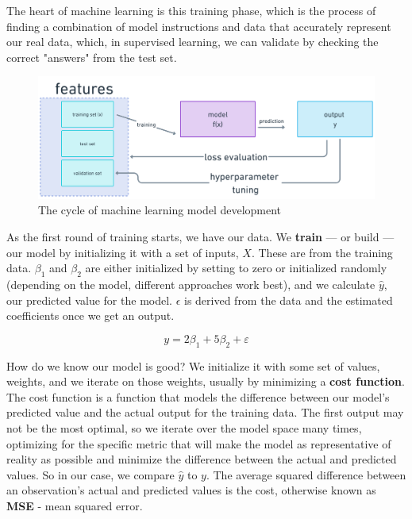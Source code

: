 \documentclass[11pt, table]{diazessay} %
\begin{document}
\begin{sloppypar}
The heart of machine learning is this training phase, which is the process of finding a combination of model instructions and data that accurately represent our real data, which, in supervised learning, we can validate by checking the correct "answers" from the test set.

\begin{figure}[H]
  \includegraphics[width=\linewidth]{figures/model_cycle.png}
  \caption{The cycle of machine learning model development}
\end{figure}

As the first round of training starts, we have our data. We \textbf{train} --- or build  --- our model by initializing it with a set of inputs, $X$. These are from the training data. $\beta_1$ and $\beta_2$ are either initialized by setting to zero or initialized randomly (depending on the model, different approaches work best), and we calculate $\hat{y}$, our predicted value for the model. $\epsilon$ is derived from the data and the estimated coefficients once we get an output.

\begin{equation}
y = 2\beta_1 + 5\beta_2 + \varepsilon
\end{equation}

How do we know our model is good? We initialize it with some set of values, weights, and we iterate on those weights, usually by minimizing a \textbf{cost function}. The cost function is a function that models the difference between our model's predicted value and the actual output for the training data. The first output may not be the most optimal, so we iterate over the model space many times, optimizing for the specific metric that will make the model as representative of reality as possible and minimize the difference between the actual and predicted values. So in our case, we compare $\hat{y}$ to $y$. The average squared difference between an observation’s actual and predicted values is the cost, otherwise known as \textbf{MSE} - mean squared error.


\end{sloppypar}
\end{document}
